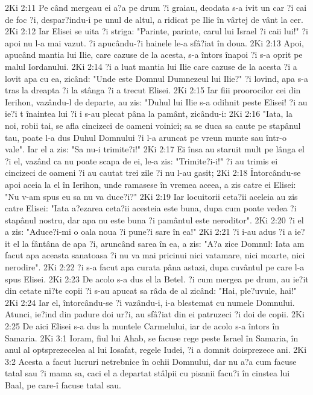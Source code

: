 2Ki 2:11  Pe când mergeau ei a?a pe drum ?i graiau, deodata s-a ivit un car ?i cai de foc ?i, despar?indu-i pe unul de altul, a ridicat pe Ilie în vârtej de vânt la cer.
2Ki 2:12  Iar Elisei se uita ?i striga: "Parinte, parinte, carul lui Israel ?i caii lui!" ?i apoi nu l-a mai vazut. ?i apucându-?i hainele le-a sfâ?iat în doua.
2Ki 2:13  Apoi, apucând mantia lui Ilie, care cazuse de la acesta, s-a întors înapoi ?i s-a oprit pe malul Iordanului.
2Ki 2:14  ?i a luat mantia lui Ilie care cazuse de la acesta ?i a lovit apa cu ea, zicând: "Unde este Domnul Dumnezeul lui Ilie?" ?i lovind, apa s-a tras la dreapta ?i la stânga ?i a trecut Elisei.
2Ki 2:15  Iar fiii proorocilor cei din Ierihon, vazându-l de departe, au zis: "Duhul lui Ilie s-a odihnit peste Elisei! ?i au ie?i t înaintea lui ?i i s-au plecat pâna la pamânt, zicându-i:
2Ki 2:16  "Iata, la noi, robii tai, se afla cincizeci de oameni voinici; sa se duca sa caute pe stapânul tau, poate l-a dus Duhul Domnului ?i l-a aruncat pe vreun munte sau într-o vale". Iar el a zis: "Sa nu-i trimite?i!"
2Ki 2:17  Ei însa au staruit mult pe lânga el ?i el, vazând ca nu poate scapa de ei, le-a zis: "Trimite?i-i!" ?i au trimis ei cincizeci de oameni ?i au cautat trei zile ?i nu l-au gasit;
2Ki 2:18  Întorcându-se apoi aceia la el în Ierihon, unde ramasese în vremea aceea, a zis catre ei Elisei: "Nu v-am spus eu sa nu va duce?i?"
2Ki 2:19  Iar locuitorii ceta?ii aceleia au zis catre Elisei: "Iata a?ezarea ceta?ii acesteia este buna, dupa cum poate vedea ?i stapânul nostru, dar apa nu este buna ?i pamântul este neroditor".
2Ki 2:20  ?i el a zis: "Aduce?i-mi o oala noua ?i pune?i sare în ea!"
2Ki 2:21  ?i i-au adus ?i a ie?it el la fântâna de apa ?i, aruncând sarea în ea, a zis: "A?a zice Domnul: Iata am facut apa aceasta sanatoasa ?i nu va mai pricinui nici vatamare, nici moarte, nici nerodire".
2Ki 2:22  ?i s-a facut apa curata pâna astazi, dupa cuvântul pe care l-a spus Elisei.
2Ki 2:23  De acolo s-a dus el la Betel. ?i cum mergea pe drum, au ie?it din cetate ni?te copii ?i s-au apucat sa râda de al zicând: "Hai, ple?uvule, hai!"
2Ki 2:24  Iar el, întorcându-se ?i vazându-i, i-a blestemat cu numele Domnului. Atunci, ie?ind din padure doi ur?i, au sfâ?iat din ei patruzeci ?i doi de copii.
2Ki 2:25  De aici Elisei s-a dus la muntele Carmelului, iar de acolo s-a întors în Samaria.
2Ki 3:1  Ioram, fiul lui Ahab, se facuse rege peste Israel în Samaria, în anul al optsprezecelea al lui Iosafat, regele Iudei, ?i a domnit doisprezece ani.
2Ki 3:2  Acesta a facut lucruri netrebnice în ochii Domnului, dar nu a?a cum facuse tatal sau ?i mama sa, caci el a departat stâlpii cu pisanii facu?i în cinstea lui Baal, pe care-î facuse tatal sau.
